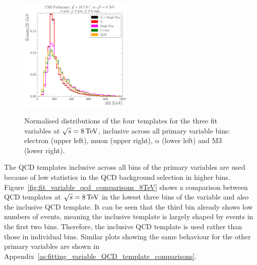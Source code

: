 \begin{figure}[hbtp]
     \includegraphics[width=0.48\textwidth]{Chapters/04_Analysis/04b_XSections/images/8TeV/fit_variables/MET/M3/MET_inclusive_M3_2orMoreBtags_templates.pdf}\\
	 \caption{Normalised distributions of the four templates for the three fit variables at $\sqrt{s}=8\,\text{Te\hspace{-.08em}V}$,
	 inclusive across all primary variable bins: electron \abseta (upper left), muon \abseta (upper right),
	 $\alpha$ (lower left) and M3 (lower right).}
     \label{fig:fit_variable_distributions_8TeV}
\end{figure}
\FloatBarrier

The QCD templates inclusive across all bins of the primary variables are used because of low statistics
in the QCD background selection in higher bins. Figure~\ref{fig:fit_variable_qcd_comparisons_8TeV} shows a
comparison between QCD templates at $\sqrt{s}=8\,\text{Te\hspace{-.08em}V}$ in the lowest three bins of the \met variable and also
the inclusive \met QCD template. It can be seen that the third \met bin already shows low numbers of events,
meaning the inclusive template is largely shaped by events in the first two bins. Therefore, the inclusive QCD
template is used rather than those in individual bins. Similar plots showing the same behaviour for the other
primary variables are shown in Appendix~\ref{as:fitting_variable_QCD_template_comparisons}.

